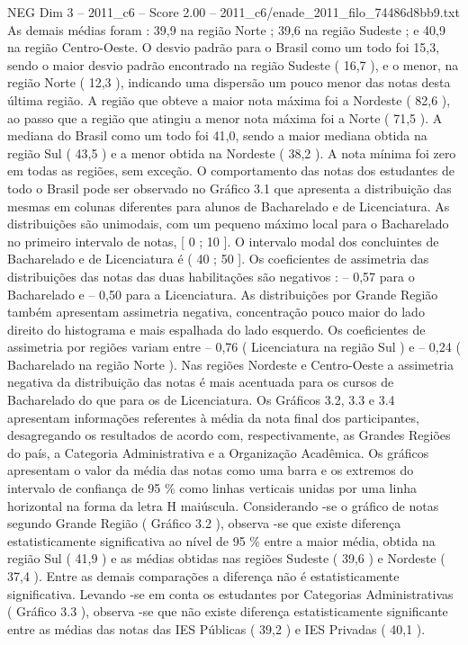 \begin{textsample}{NEG Dim 3 – 2011\_c6 – Score 2.00 – 2011\_c6/enade\_2011\_filo\_74486d8bb9.txt}
As demais médias foram : 39,9 na região Norte ; 39,6 na região Sudeste ; e 40,9 na região Centro-Oeste.
O desvio padrão para o Brasil como um todo foi 15,3, sendo o maior desvio padrão encontrado na região Sudeste ( 16,7 ), e o menor, na região Norte ( 12,3 ), indicando uma dispersão um pouco menor das notas desta última região.
A região que obteve a maior nota máxima foi a Nordeste ( 82,6 ), ao passo que a região que atingiu a menor nota máxima foi a Norte ( 71,5 ).
A mediana do Brasil como um todo foi 41,0, sendo a maior mediana obtida na região Sul ( 43,5 ) e a menor obtida na Nordeste ( 38,2 ).
A nota mínima foi zero em todas as regiões, sem exceção.
O comportamento das notas dos estudantes de todo o Brasil pode ser observado no Gráfico 3.1 que apresenta a distribuição das mesmas em colunas diferentes para alunos de Bacharelado e de Licenciatura.
As distribuições são unimodais, com um pequeno máximo local para o Bacharelado no primeiro intervalo de notas, [ 0 ; 10 ].
O intervalo modal dos concluintes de Bacharelado e de Licenciatura é ( 40 ; 50 ].
Os coeficientes de assimetria das distribuições das notas das duas habilitações são negativos : – 0,57 para o Bacharelado e – 0,50 para a Licenciatura.
As distribuições por Grande Região também apresentam assimetria negativa, concentração pouco maior do lado direito do histograma e mais espalhada do lado esquerdo.
Os coeficientes de assimetria por regiões variam entre – 0,76 ( Licenciatura na região Sul ) e – 0,24 ( Bacharelado na região Norte ).
Nas regiões Nordeste e Centro-Oeste a assimetria negativa da distribuição das notas é mais acentuada para os cursos de Bacharelado do que para os de Licenciatura.
Os Gráficos 3.2, 3.3 e 3.4 apresentam informações referentes à média da nota final dos participantes, desagregando os resultados de acordo com, respectivamente, as Grandes Regiões do país, a Categoria Administrativa e a Organização Acadêmica.
Os gráficos apresentam o valor da média das notas como uma barra e os extremos do intervalo de confiança de 95 \% como linhas verticais unidas por uma linha horizontal na forma da letra H maiúscula.
Considerando -se o gráfico de notas segundo Grande Região ( Gráfico 3.2 ), observa -se que existe diferença estatisticamente significativa ao nível de 95 \% entre a maior média, obtida na região Sul ( 41,9 ) e as médias obtidas nas regiões Sudeste ( 39,6 ) e Nordeste ( 37,4 ).
Entre as demais comparações a diferença não é estatisticamente significativa.
Levando -se em conta os estudantes por Categorias Administrativas ( Gráfico 3.3 ), observa -se que não existe diferença estatisticamente significante entre as médias das notas das IES Públicas ( 39,2 ) e IES Privadas ( 40,1 ).

\end{textsample}
